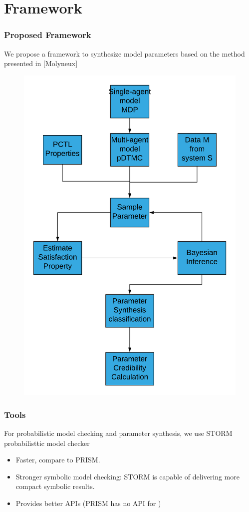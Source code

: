 \documentclass{beamer}
\begin{document}
\section{Framework}
\begin{frame}
  \frametitle{Proposed Framework}
  We propose a framework to synthesize model parameters based on the method
  presented in [Molyneux]
  \begin{figure}[t]
    \includegraphics[height=\textheight]{abcsmc2.png} \centering
  \end{figure}
\end{frame}

\begin{frame}
  \frametitle{Tools}
  For probabilistic model checking and parameter synthesis, we use STORM
  probabilisttic model checker
  \begin{itemize}
  \item Faster, compare to PRISM.
  \item Stronger symbolic model checking: STORM is capable of delivering more
    compact symbolic results.
  \item Provides better APIs (PRISM has no API for )
  \end{itemize}
\end{frame}
\end{document}
